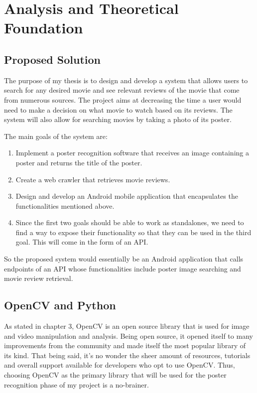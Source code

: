 \documentclass[12pt,a4paper,twoside]{report}
\begin{document}

 \chapter{Analysis and Theoretical Foundation}

\vspace{1cm}
\section{Proposed Solution}

The purpose of my thesis is to design and develop a system that allows users to search for any desired movie and see relevant reviews of the movie that come from numerous sources. The project aims at decreasing the time a user would need to make a decision on what movie to watch based on its reviews. The system will also allow for searching movies by taking a photo of its poster. 

The main goals of the system are:
\begin{enumerate}
    \item Implement a poster recognition software that receives an image containing a poster and returns the title of the poster.
    \item Create a web crawler that retrieves movie reviews.
    \item Design and develop an Android mobile application that encapsulates the functionalities mentioned above.
    \item Since the first two goals should be able to work as standalones, we need to find a way to expose their functionality so that they can be used in the third goal. This will come in the form of an API.
\end{enumerate}

So the proposed system would essentially be an Android application that calls endpoints of an API whose functionalities include poster image searching and movie review retrieval. 


\newpage
\section{OpenCV and Python}
As stated in chapter 3, OpenCV is an open source library that is used for image and video manipulation and analysis. Being open source, it opened itself to many improvements from the community and made itself the most popular library of its kind. That being said, it's no wonder the sheer amount of resources, tutorials and overall support available for developers who opt to use OpenCV. Thus, choosing OpenCV as the primary library that will be used for  the poster recognition phase of my project is a no-brainer.
\end{document}
